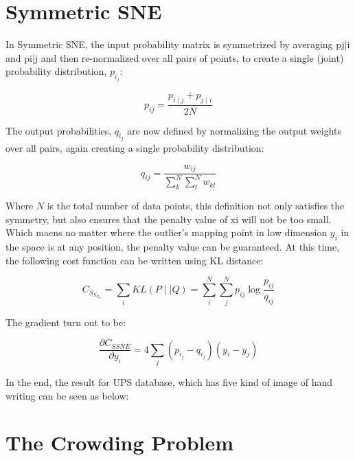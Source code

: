 \section{Symmetric SNE}
In Symmetric SNE, the input probability matrix is symmetrized by averaging pj|i and pi|j and then re-normalized over all pairs of points, to create a single (joint) probability distribution, $p_i_j$:

\begin{equation*}
    {p_{i j}} = \frac {p_{i\mid j} + p_{j\mid i}} {2N}
\end{equation*}

\noindent The output probabilities, $q_i_j$ are now defined by normalizing the output weights over all pairs, again creating a single probability distribution:

\begin{equation*}
    {q_{i j}} = \frac {w_{i j}} {\sum_k^N \sum_l^N w_{k l}}
\end{equation*}

\noindent Where $N$ is the total number of data points, this definition not only satisfies the symmetry, but also ensures that the penalty value of xi will not be too small. Which maens no matter where the outlier's mapping point in low dimension $y_i$ in the space is at any position, the penalty value can be guaranteed. At this time, the following cost function can be written using KL distance:

\begin{equation*}
    {C_S_S_N_E} = {\sum_i KL(P \mid \mid Q)} =  { {\sum_i^N} {\sum_j^N} {p_{i j}} \log \frac{p_{i j}}{q_{i j}} }
\end{equation*}

\noindent The gradient turn out to be: 

\begin{equation*}
\frac{\partial C_{SSNE}}{\partial y_i} = 4\sum_j(p_i_j - q_i_j)(y_i - y_j)
\end{equation*}

\noindent In the end, the result for UPS database, which has five kind of image of hand writing can be seen as below:



\section{The Crowding Problem}

